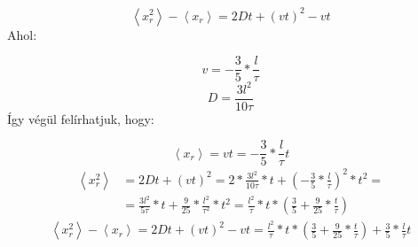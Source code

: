 \begin{equation} \label{eq:39}
    \left< x_{r}^{2} \right> - \left< x_{r} \right> = \boxed{2Dt + \left( vt \right)^{2} - vt}
\end{equation}
Ahol:

\begin{equation*}
    v = - \frac{3}{5} * \frac{l}{\tau}
\end{equation*}
\begin{equation*}
    D = \frac{3 l^{2}}{10 \tau}
\end{equation*}
Így végül felírhatjuk, hogy:

\begin{equation} \label{eq:40}
    \left< x_{r} \right>
    =
    vt
    =
    - \frac{3}{5} * \frac{l}{\tau} t
\end{equation}
\begin{align} \label{eq:41}
    \left< x_{r}^{2} \right>
    &=
    2Dt + \left( vt \right)^{2}
    =
    2 * \frac{3 l^{2}}{10 \tau} * t + \left( - \frac{3}{5} * \frac{l}{\tau} \right)^{2} * t^{2} = \nonumber \\
    &=
    \frac{3 l^{2}}{5 \tau} * t + \frac{9}{25} * \frac{l^{2}}{\tau^{2}} * t^{2}
    =
    \frac{l^{2}}{\tau} * t * \left( \frac{3}{5} + \frac{9}{25} * \frac{t}{\tau} \right)
\end{align}
\begin{align} \label{eq:42}
    \left< x_{r}^{2} \right> - \left< x_{r} \right> = 2Dt + \left( vt \right)^{2} - vt  = \frac{l^{2}}{\tau} * t * \left( \frac{3}{5} + \frac{9}{25} * \frac{t}{\tau} \right) + \frac{3}{5} * \frac{l}{\tau} t
\end{align}
